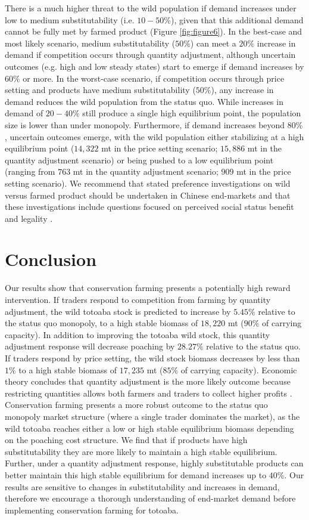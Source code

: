 There is a much higher threat to the wild population if demand increases under low to medium substitutability (i.e. $10-50\%$), given that this additional demand cannot be fully met by farmed product (Figure \ref{fig:figure6}). In the best-case and most likely scenario, medium substitutability ($50\%$) can meet a $20\%$ increase in demand if competition occurs through quantity adjustment, although uncertain outcomes (e.g. high and low steady states) start to emerge if demand increases by $60\%$ or more. In the worst-case scenario, if competition occurs through price setting and products have medium substitutability ($50\%$), any increase in demand reduces the wild population from the status quo. While increases in demand of $20-40\%$ still produce a single high equilibrium point, the population size is lower than under monopoly. Furthermore, if demand increases beyond $80\%$, uncertain outcomes emerge, with the wild population either stabilizing at a high equilibrium point ($14,322$ mt in the price setting scenario; $15,886$ mt in the quantity adjustment scenario) or being pushed to a low equilibrium point (ranging from $763$ mt in the quantity adjustment scenario; $909$ mt in the price setting scenario). We recommend that stated preference investigations on wild versus farmed product should be undertaken in Chinese end-markets and that these investigations include questions focused on perceived social status benefit and legality \citep{hinsley_wild_2020}. 

\section{Conclusion}
Our results show that conservation farming presents a potentially high reward intervention. If traders respond to competition from farming by quantity adjustment, the wild totoaba stock is predicted to increase by $5.45\%$ relative to the status quo monopoly, to a high stable biomass of $18,220$ mt ($90\%$ of carrying capacity). In addition to improving the totoaba wild stock, this quantity adjustment response will decrease poaching by $28.27\%$ relative to the status quo. If traders respond by price setting, the wild stock biomass decreases by less than $1\%$ to a high stable biomass of $17,235$ mt ($85\%$ of carrying capacity). Economic theory concludes that quantity adjustment is the more likely outcome because restricting quantities allows both farmers and traders to collect higher profits \citep{singh_price_1984}. Conservation farming presents a more robust outcome to the status quo monopoly market structure (where a single trader dominates the market), as the wild totoaba reaches either a low or high stable equilibrium biomass depending on the poaching cost structure. We find that if products have high substitutability they are more likely to maintain a high stable equilibrium. Further, under a quantity adjustment response, highly substitutable products can better maintain this high stable equilibrium for demand increases up to $40\%$. Our results are sensitive to changes in substitutability and increases in demand, therefore we encourage a thorough understanding of end-market demand before implementing conservation farming for totoaba.

